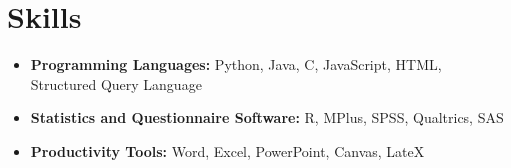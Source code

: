 \documentclass[12pt]{article}
\begin{document}
\section{Skills}
\begin{itemize}
    \itemsep=-.3em
    \item \textbf{Programming Languages:} Python, Java, C, JavaScript, HTML, Structured Query Language 
    \item \textbf{Statistics and Questionnaire Software:} R, MPlus, SPSS, Qualtrics, SAS
    \item \textbf{Productivity Tools:} Word, Excel, PowerPoint, Canvas, LateX
\end{itemize}
\end{document}
